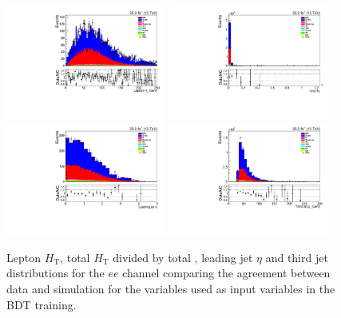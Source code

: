 \begin{figure}[htb]
\centering
\includegraphics[width=0.47\textwidth]{figs/background-estimation/plots/unblinded/prompt_ee_ttbarInc/lepHt_NPL_ee_wMass_ee.pdf}
\includegraphics[width=0.47\textwidth]{figs/background-estimation/plots/unblinded/prompt_ee_ttbarInc/totHtOverPt_NPL_ee_wMass_ee.pdf}
\\
\includegraphics[width=0.47\textwidth]{figs/background-estimation/plots/unblinded/prompt_ee_ttbarInc/leadingJetEta_NPL_ee_wMass_ee.pdf}
\includegraphics[width=0.47\textwidth]{figs/background-estimation/plots/unblinded/prompt_ee_ttbarInc/thirdJetPt_NPL_ee_wMass_ee.pdf}
\caption{
Lepton ${\ensuremath{H_{\mathrm{T}}}}$, total ${\ensuremath{H_{\mathrm{T}}}}$ divided by total \pt, leading jet $\eta$ and third jet \pT distributions for the $ee$ channel comparing the agreement between data and simulation for the variables used as input variables in the BDT training.}
\label{fig:appInputFeaturesDataSimAgreement2}
\end{figure}

